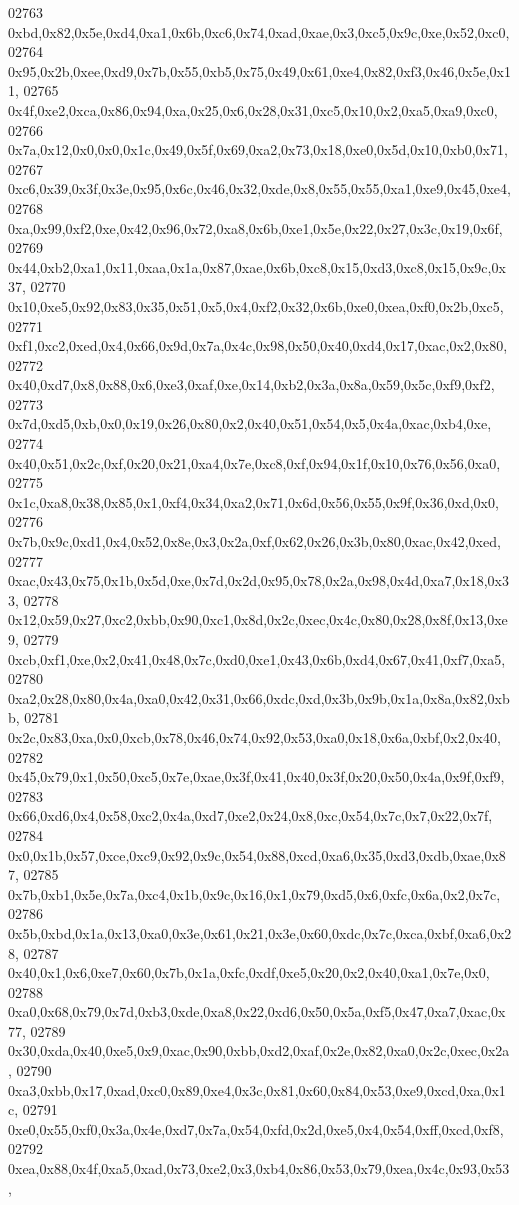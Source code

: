 \begin{DoxyCode}
02763   0xbd,0x82,0x5e,0xd4,0xa1,0x6b,0xc6,0x74,0xad,0xae,0x3,0xc5,0x9c,0xe,0x52,0xc0,
02764   0x95,0x2b,0xee,0xd9,0x7b,0x55,0xb5,0x75,0x49,0x61,0xe4,0x82,0xf3,0x46,0x5e,0x11,
02765   0x4f,0xe2,0xca,0x86,0x94,0xa,0x25,0x6,0x28,0x31,0xc5,0x10,0x2,0xa5,0xa9,0xc0,
02766   0x7a,0x12,0x0,0x0,0x1c,0x49,0x5f,0x69,0xa2,0x73,0x18,0xe0,0x5d,0x10,0xb0,0x71,
02767   0xc6,0x39,0x3f,0x3e,0x95,0x6c,0x46,0x32,0xde,0x8,0x55,0x55,0xa1,0xe9,0x45,0xe4,
02768   0xa,0x99,0xf2,0xe,0x42,0x96,0x72,0xa8,0x6b,0xe1,0x5e,0x22,0x27,0x3c,0x19,0x6f,
02769   0x44,0xb2,0xa1,0x11,0xaa,0x1a,0x87,0xae,0x6b,0xc8,0x15,0xd3,0xc8,0x15,0x9c,0x37,
02770   0x10,0xe5,0x92,0x83,0x35,0x51,0x5,0x4,0xf2,0x32,0x6b,0xe0,0xea,0xf0,0x2b,0xc5,
02771   0xf1,0xc2,0xed,0x4,0x66,0x9d,0x7a,0x4c,0x98,0x50,0x40,0xd4,0x17,0xac,0x2,0x80,
02772   0x40,0xd7,0x8,0x88,0x6,0xe3,0xaf,0xe,0x14,0xb2,0x3a,0x8a,0x59,0x5c,0xf9,0xf2,
02773   0x7d,0xd5,0xb,0x0,0x19,0x26,0x80,0x2,0x40,0x51,0x54,0x5,0x4a,0xac,0xb4,0xe,
02774   0x40,0x51,0x2c,0xf,0x20,0x21,0xa4,0x7e,0xc8,0xf,0x94,0x1f,0x10,0x76,0x56,0xa0,
02775   0x1c,0xa8,0x38,0x85,0x1,0xf4,0x34,0xa2,0x71,0x6d,0x56,0x55,0x9f,0x36,0xd,0x0,
02776   0x7b,0x9c,0xd1,0x4,0x52,0x8e,0x3,0x2a,0xf,0x62,0x26,0x3b,0x80,0xac,0x42,0xed,
02777   0xac,0x43,0x75,0x1b,0x5d,0xe,0x7d,0x2d,0x95,0x78,0x2a,0x98,0x4d,0xa7,0x18,0x33,
02778   0x12,0x59,0x27,0xc2,0xbb,0x90,0xc1,0x8d,0x2c,0xec,0x4c,0x80,0x28,0x8f,0x13,0xe9,
02779   0xcb,0xf1,0xe,0x2,0x41,0x48,0x7c,0xd0,0xe1,0x43,0x6b,0xd4,0x67,0x41,0xf7,0xa5,
02780   0xa2,0x28,0x80,0x4a,0xa0,0x42,0x31,0x66,0xdc,0xd,0x3b,0x9b,0x1a,0x8a,0x82,0xbb,
02781   0x2c,0x83,0xa,0x0,0xcb,0x78,0x46,0x74,0x92,0x53,0xa0,0x18,0x6a,0xbf,0x2,0x40,
02782   0x45,0x79,0x1,0x50,0xc5,0x7e,0xae,0x3f,0x41,0x40,0x3f,0x20,0x50,0x4a,0x9f,0xf9,
02783   0x66,0xd6,0x4,0x58,0xc2,0x4a,0xd7,0xe2,0x24,0x8,0xc,0x54,0x7c,0x7,0x22,0x7f,
02784   0x0,0x1b,0x57,0xce,0xc9,0x92,0x9c,0x54,0x88,0xcd,0xa6,0x35,0xd3,0xdb,0xae,0x87,
02785   0x7b,0xb1,0x5e,0x7a,0xc4,0x1b,0x9c,0x16,0x1,0x79,0xd5,0x6,0xfc,0x6a,0x2,0x7c,
02786   0x5b,0xbd,0x1a,0x13,0xa0,0x3e,0x61,0x21,0x3e,0x60,0xdc,0x7c,0xca,0xbf,0xa6,0x28,
02787   0x40,0x1,0x6,0xe7,0x60,0x7b,0x1a,0xfc,0xdf,0xe5,0x20,0x2,0x40,0xa1,0x7e,0x0,
02788   0xa0,0x68,0x79,0x7d,0xb3,0xde,0xa8,0x22,0xd6,0x50,0x5a,0xf5,0x47,0xa7,0xac,0x77,
02789   0x30,0xda,0x40,0xe5,0x9,0xac,0x90,0xbb,0xd2,0xaf,0x2e,0x82,0xa0,0x2c,0xec,0x2a,
02790   0xa3,0xbb,0x17,0xad,0xc0,0x89,0xe4,0x3c,0x81,0x60,0x84,0x53,0xe9,0xcd,0xa,0x1c,
02791   0xe0,0x55,0xf0,0x3a,0x4e,0xd7,0x7a,0x54,0xfd,0x2d,0xe5,0x4,0x54,0xff,0xcd,0xf8,
02792   0xea,0x88,0x4f,0xa5,0xad,0x73,0xe2,0x3,0xb4,0x86,0x53,0x79,0xea,0x4c,0x93,0x53,

\end{DoxyCode}
